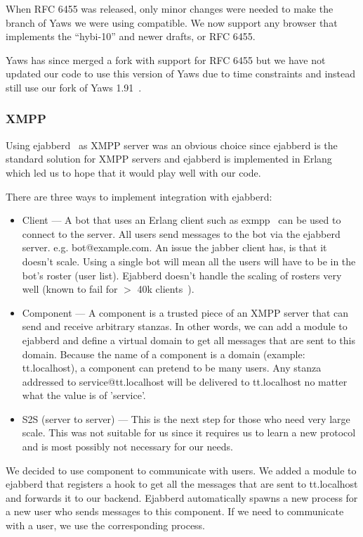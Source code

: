 \documentclass[11pt,a4paper]{report}
\begin{document}
When RFC 6455 was released, only minor changes were needed to make the branch of
Yaws we were using compatible. We now support any browser that implements
the ``hybi-10'' and newer drafts, or RFC 6455.

Yaws has since merged a fork with support for RFC 6455 but we have not updated
our code to use this version of Yaws due to time constraints and instead still
use our fork of Yaws 1.91~\cite{our-yaws}.


\subsubsection{XMPP}
Using ejabberd~\cite{ejabberd} as XMPP server was an obvious choice since ejabberd is the
standard solution for XMPP servers and ejabberd is implemented
in Erlang which led us to hope that it would play well with our code.

There are three ways to implement integration with ejabberd:

\begin{itemize}
\item Client --- A bot that uses an Erlang client such as exmpp~\cite{exmpp} can be used to
connect to the server.
All users send messages to the bot via the ejabberd server. e.g. bot@example.com.
An issue the jabber client has, is that it doesn’t scale. Using a single bot
will mean all the users will have to be in the bot’s roster (user list).
Ejabberd doesn’t handle the scaling of rosters very well (known to fail for
$>$ 40k clients~\cite{40k-roster}).

\item Component --- A component is a trusted piece of an XMPP server that can send
and receive arbitrary stanzas.
In other words, we can add a module to ejabberd and define a virtual domain to
get all messages that are sent to this domain.
Because the name of a component is a domain (example: tt.localhost), a component
can pretend to be many users.
Any stanza addressed to service@tt.localhost will be delivered to tt.localhost
no matter what the value is of 'service'.
\item S2S (server to server) --- This is the next step for those who need very
large scale. This was not suitable for us since it requires us to learn a new
protocol and is most possibly not necessary for our needs.
\end{itemize}

We decided to use component to communicate with users. We added a module to
ejabberd that registers a hook to get all the messages that are sent to
tt.localhost and forwards it to our backend. Ejabberd automatically spawns a
new process for a new user who sends messages to this component.
If we need to communicate with a user, we use the corresponding process.
\end{document}
